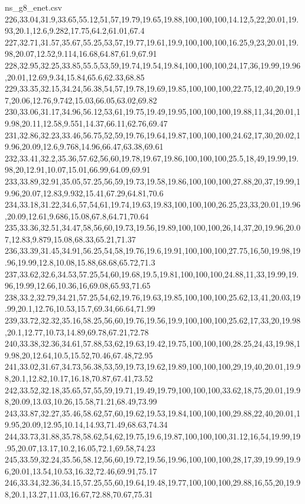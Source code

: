 \begin{filecontents*}[overwrite]{ns_g8_enet.csv}
226,33.04,31.9,33.65,55.12,51,57,19.79,19.65,19.88,100,100,100,14.12,5,22,20.01,19.93,20.1,12.6,9.282,17.75,64.2,61.01,67.4
227,32.71,31.57,35.67,55.25,53,57,19.77,19.61,19.9,100,100,100,16.25,9,23,20.01,19.98,20.07,12.52,9.114,16.68,64.87,61.9,67.91
228,32.95,32.25,33.85,55.5,53,59,19.74,19.54,19.84,100,100,100,24,17,36,19.99,19.96,20.01,12.69,9.34,15.84,65.6,62.33,68.85
229,33.35,32.15,34.24,56.38,54,57,19.78,19.69,19.85,100,100,100,22.75,12,40,20,19.97,20.06,12.76,9.742,15.03,66.05,63.02,69.82
230,33.06,31.17,34.96,56.12,53,61,19.75,19.49,19.95,100,100,100,19.88,11,34,20.01,19.98,20.11,12.58,9.551,14.37,66.11,62.76,69.47
231,32.86,32.23,33.46,56.75,52,59,19.76,19.64,19.87,100,100,100,24.62,17,30,20.02,19.96,20.09,12.6,9.768,14.96,66.47,63.38,69.61
232,33.41,32.2,35.36,57.62,56,60,19.78,19.67,19.86,100,100,100,25.5,18,49,19.99,19.98,20,12.91,10.07,15.01,66.99,64.09,69.91
233,33.89,32.91,35.05,57.25,56,59,19.73,19.58,19.86,100,100,100,27.88,20,37,19.99,19.96,20.07,12.83,9.932,15.41,67.29,64.81,70.6
234,33.18,31.22,34.6,57,54,61,19.74,19.63,19.83,100,100,100,26.25,23,33,20.01,19.96,20.09,12.61,9.686,15.08,67.8,64.71,70.64
235,33.36,32.51,34.47,58,56,60,19.73,19.56,19.89,100,100,100,26,14,37,20,19.96,20.07,12.83,9.879,15.08,68.33,65.21,71.37
236,33.39,31.45,34.91,56.25,54,58,19.76,19.6,19.91,100,100,100,27.75,16,50,19.98,19.96,19.99,12.8,10.08,15.88,68.68,65.72,71.3
237,33.62,32.6,34.53,57.25,54,60,19.68,19.5,19.81,100,100,100,24.88,11,33,19.99,19.96,19.99,12.66,10.36,16,69.08,65.93,71.65
238,33.2,32.79,34.21,57.25,54,62,19.76,19.63,19.85,100,100,100,25.62,13,41,20.03,19.99,20.1,12.76,10.53,15.7,69.34,66.64,71.99
239,33.72,32.32,35.16,58.25,56,60,19.76,19.56,19.9,100,100,100,25.62,17,33,20,19.98,20.1,12.77,10.73,14.89,69.78,67.21,72.78
240,33.38,32.36,34.61,57.88,53,62,19.63,19.42,19.75,100,100,100,28.25,24,43,19.98,19.98,20,12.64,10.5,15.52,70.46,67.48,72.95
241,33.02,31.67,34.73,56.38,53,59,19.73,19.62,19.89,100,100,100,29,19,40,20.01,19.98,20.1,12.82,10.17,16.18,70.87,67.41,73.52
242,33.52,32.18,35.65,57,55,59,19.71,19.49,19.79,100,100,100,33.62,18,75,20.01,19.98,20.09,13.03,10.26,15.58,71.21,68.49,73.99
243,33.87,32.27,35.46,58.62,57,60,19.62,19.53,19.84,100,100,100,29.88,22,40,20.01,19.95,20.09,12.95,10.14,14.93,71.49,68.63,74.34
244,33.73,31.88,35.78,58.62,54,62,19.75,19.6,19.87,100,100,100,31.12,16,54,19.99,19.95,20.07,13.17,10.2,16.05,72.1,69.58,74.23
245,33.59,32.24,35.56,58.12,56,60,19.72,19.56,19.96,100,100,100,28,17,39,19.99,19.96,20.01,13.54,10.53,16.32,72.46,69.91,75.17
246,33.34,32.36,34.15,57.25,55,60,19.64,19.48,19.77,100,100,100,29.88,16,55,20,19.98,20.1,13.27,11.03,16.67,72.88,70.67,75.31

\end{filecontents*}
